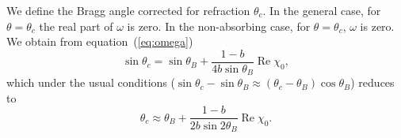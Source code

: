 \documentclass[preprint]{iucr}              %
\newcommand{\inred}[1]{{\color{red}#1}}
\begin{document}
\inred{We define the Bragg angle corrected for refraction $\theta_c$. In the general case, for $\theta=\theta_c$ the real part of $\omega$ is zero. In the non-absorbing case,  for $\theta=\theta_c$, $\omega$ is zero.}
We obtain from equation~(\ref{eq:omega})
\begin{equation}\label{eq:correctedBraggAngleExact}
   \sin\theta_c = \sin\theta_B + \frac{1-b}{4 b \sin\theta_B} \operatorname{Re}\chi_0,   
\end{equation}
which under the usual conditions ($\sin\theta_c-\sin\theta_B \approx  (\theta_c-\theta_B) \cos\theta_B$) reduces to
\begin{equation}\label{eq:correctedBraggAngle}
   \theta_c \approx \theta_B + \frac{1-b}{2 b \sin2\theta_B} \operatorname{Re}\chi_0.  
\end{equation} 
\end{document}
